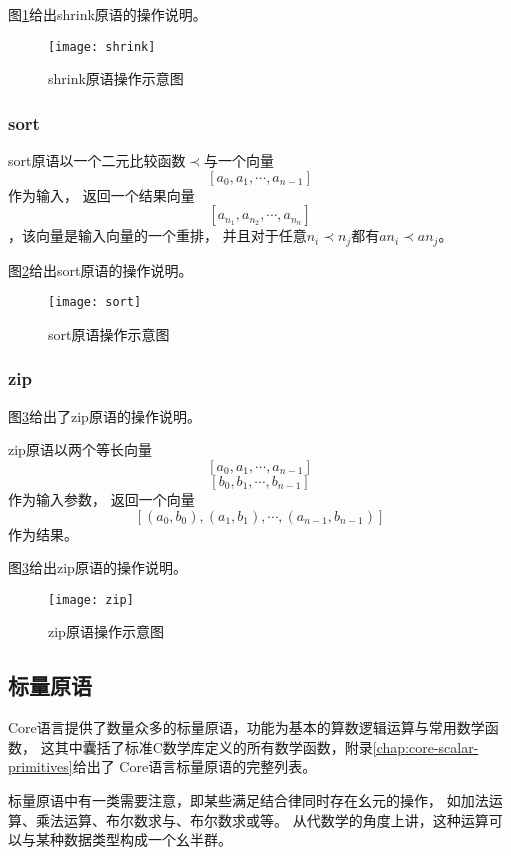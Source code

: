 图\ref{fig:shrink-diagram}给出shrink原语的操作说明。
\begin{figure}[h]
  \centering
  \texttt{[image: shrink]}
  \caption{shrink原语操作示意图}
  \label{fig:shrink-diagram}
\end{figure}

\subsubsection{sort}
\begin{definition}
  sort原语以一个二元比较函数$\prec$与一个向量$$[a_0, a_1, \cdots, a_{n-1}]$$作为输入，
  返回一个结果向量$$[a_{n_1}, a_{n_2}, \cdots, a_{n_n}]$$，该向量是输入向量的一个重排，
  并且对于任意$n_i\prec{}n_j$都有$a{n_i}\prec{}a{n_j}$。
\end{definition}

图\ref{fig:sort-diagram}给出sort原语的操作说明。
\begin{figure}[h]
  \centering
  \texttt{[image: sort]}
  \caption{sort原语操作示意图}
  \label{fig:sort-diagram}
\end{figure}

\subsubsection{zip}
图\ref{fig:zip-diagram}给出了zip原语的操作说明。
\begin{definition}
  zip原语以两个等长向量$$[a_0, a_1, \cdots, a_{n-1}]$$ $$[b_0, b_1, \cdots, b_{n-1}]$$作为输入参数，
  返回一个向量$$[(a_0, b_0), (a_1, b_1), \cdots, (a_{n-1}, b_{n-1})]$$作为结果。
\end{definition}

图\ref{fig:zip-diagram}给出zip原语的操作说明。
\begin{figure}[h]
  \centering
  \texttt{[image: zip]}
  \caption{zip原语操作示意图}
  \label{fig:zip-diagram}
\end{figure}

\subsection{标量原语}\label{subsec:scalar-primitives}
Core语言提供了数量众多的标量原语，功能为基本的算数逻辑运算与常用数学函数，
这其中囊括了标准C数学库定义的所有数学函数，附录\ref{chap:core-scalar-primitives}给出了
Core语言标量原语的完整列表。

标量原语中有一类需要注意，即某些满足结合律同时存在幺元的操作，
如加法运算、乘法运算、布尔数求与、布尔数求或等。
从代数学的角度上讲，这种运算可以与某种数据类型构成一个幺半群。


